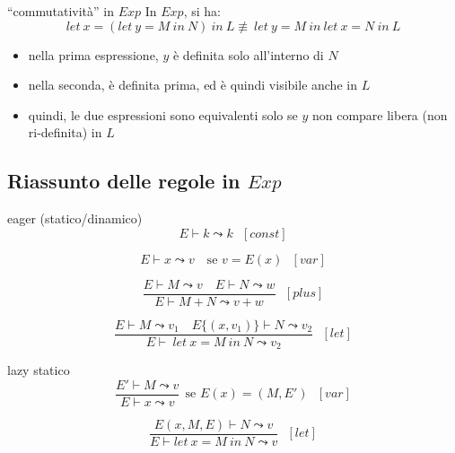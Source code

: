 \documentclass[a4paper,11pt]{report}
\begin{document}
\begin{gframe}[colframe=DeepGrey, colback=DeepGreyLight, colbacktitle=DeepGrey]{``commutatività'' in \( Exp \)}
    In \( Exp \), si ha:
    \[ let \ x = (let \ y  = M \ in \ N) \ in \ L \not\equiv \ let \ y = M \ in \ let \ x = N \ in \ L \]
\begin{itemize}
    \item nella prima espressione, \( y \) è definita solo all'interno di \( N \)
    \item nella seconda, è definita prima, ed è quindi visibile anche in \( L \)
    \item quindi, le due espressioni sono equivalenti solo se \( y \) non compare libera {\small \color{gray}(non ri-definita)} in \( L \)
\end{itemize}
\end{gframe}

\subsection{Riassunto delle regole in \( Exp \)}

\begin{gframe}[colframe=DeepGreen, colback=DeepGreenLight, colbacktitle=DeepGreen]{eager (statico/dinamico)}
    \vspace{-2em}
        \[ E \vdash k \leadsto k  \ \ \ [ const ] \] 
        \vspace{-2.5em}

    \[ E \vdash x \leadsto v  \ \ \ \text{ se }  v = E(x) \ \ \ [ var ] \]
        \vspace{-2em}

    \[
        \frac{
            E \vdash M \leadsto v \quad E \vdash N \leadsto w
        }{
            E \vdash M + N \leadsto v + w
        }
        \ \ \ [plus]
    \]



    \[
        \frac{
            E \vdash M \leadsto v_1 \quad E\{(x, v_1)\} \vdash N \leadsto v_2
        }{
            E \vdash \ let \ x = M \ in \ N \leadsto v_2
        }
        \ \ \  [let]
    \]


\end{gframe}


\begin{gframe}[colback=DeepTealLight]{lazy statico}
    \vspace{-2em}
    \[ \frac{E'\vdash M \leadsto v}{E\vdash x \leadsto v} \ \ \text{se } E(x)=(M, E') \ \ \ [var] \]

    \[ \frac{E(x, M, E)\vdash N \leadsto v}{E \vdash let \ x = M \ in \ N \leadsto v} \ \ \ [let]\]


\end{gframe}
\end{document}
